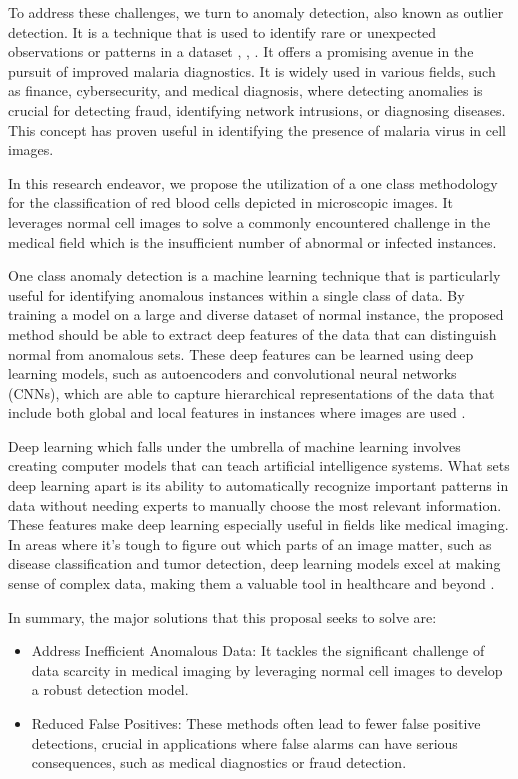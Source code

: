 \documentclass[journal,11pt,onecolumn,draftcls]{IEEEtran}
\begin{document}
To address these challenges, we turn to anomaly detection, also known as outlier detection. It is a technique that is used to identify rare or unexpected observations or patterns in a dataset \cite{chandola2009}, \cite{ruff2021}, \cite{edgeworth1887}. It offers a promising avenue in the pursuit of improved malaria diagnostics. It is widely used in various fields, such as finance, cybersecurity, and medical diagnosis, where detecting anomalies is crucial for detecting fraud, identifying network intrusions, or diagnosing diseases. This concept has proven useful in identifying the presence of malaria virus in cell images.

In this research endeavor, we propose the utilization of a one class methodology for the classification of red blood cells depicted in microscopic images. It leverages normal cell images to solve a commonly encountered challenge in the medical field which is the insufficient number of abnormal or infected instances.

One class anomaly detection is a machine learning technique that is particularly useful for identifying anomalous instances within a single class of data. By training a model on a large and diverse dataset of normal instance, the proposed method should be able to extract deep features of the data that can distinguish normal from anomalous sets. These deep features can be learned using deep learning models, such as autoencoders and convolutional neural networks (CNNs), which are able to capture hierarchical representations of the data that include both global and local features in instances where images are used \cite{torres2021}.

Deep learning which falls under the umbrella of machine learning involves creating computer models that can teach artificial intelligence systems. What sets deep learning apart is its ability to automatically recognize important patterns in data without needing experts to manually choose the most relevant information. These features make deep learning especially useful in fields like medical imaging. In areas where it's tough to figure out which parts of an image matter, such as disease classification and tumor detection, deep learning models excel at making sense of complex data, making them a valuable tool in healthcare and beyond \cite{torres2021}.

In summary, the major solutions that this proposal seeks to solve are:
\begin{itemize}
    \item Address Inefficient Anomalous Data: It tackles the significant challenge of data scarcity in medical imaging by leveraging normal cell images to develop a robust detection model.
    \item Reduced False Positives: These methods often lead to fewer false positive detections, crucial in applications where false alarms can have serious consequences, such as medical diagnostics or fraud detection.
\end{itemize}
\end{document}
